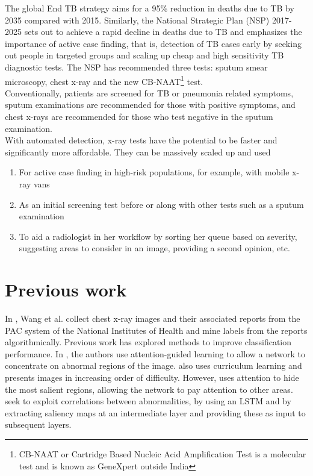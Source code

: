 \documentclass[oneside,a4paper]{article}
\begin{document}
The global End TB strategy aims for a 95\% reduction in deaths due to TB by 2035 compared with 2015. Similarly, the National Strategic Plan (NSP) 2017-2025 sets
out to achieve a rapid decline in deaths due to TB and emphasizes the importance
of active case finding, that is, detection of TB cases early by seeking out
people in targeted groups and scaling up cheap and high sensitivity TB
diagnostic tests. The NSP has recommended three tests: sputum smear microscopy,
chest x-ray and the new CB-NAAT\footnote{CB-NAAT or Cartridge Based Nucleic Acid
  Amplification Test is a molecular test and is
  known as GeneXpert outside India} test.\\

Conventionally, patients are screened for TB or pneumonia related symptoms,
sputum examinations are recommended for those with positive symptoms, and chest
x-rays are recommended for those who test negative in the sputum examination.\\

With automated detection, x-ray tests have the potential to be faster and
significantly more affordable. They can be massively scaled up and used
\begin{enumerate}
\item{For active case finding in high-risk populations, for example, with mobile
    x-ray vans\cite{modi_suresh_2019}}
\item{As an initial screening test before or along with other tests such as a
    sputum examination}
\item{To aid a radiologist in her workflow by sorting her queue based on
    severity, suggesting areas to consider in an image, providing a second
    opinion, etc.}
\end{enumerate}

\section{Previous work}
In \cite{Wang2017}, Wang et al. collect chest x-ray images and their associated
reports from the PAC system of the National Institutes of Health and mine labels
from the reports algorithmically. Previous work has explored methods to improve classification performance. In
\cite{Guan2018,Tang2018,Wang2018b,Pesce2017}, the authors use attention-guided
learning to allow a network to concentrate on abnormal regions of the image.
\cite{Tang2018} also uses curriculum learning and presents images in increasing
order of difficulty. However, \cite{Cai2018} uses attention to hide the most
salient regions, allowing the network to pay attention to other areas.
\cite{Yao,Wang2018b} seek to exploit correlations between abnormalities,
\cite{Yao} by using an LSTM and \cite{Wang2018b} by extracting saliency maps at
an intermediate layer and providing these as input to subsequent layers.\\
\end{document}

